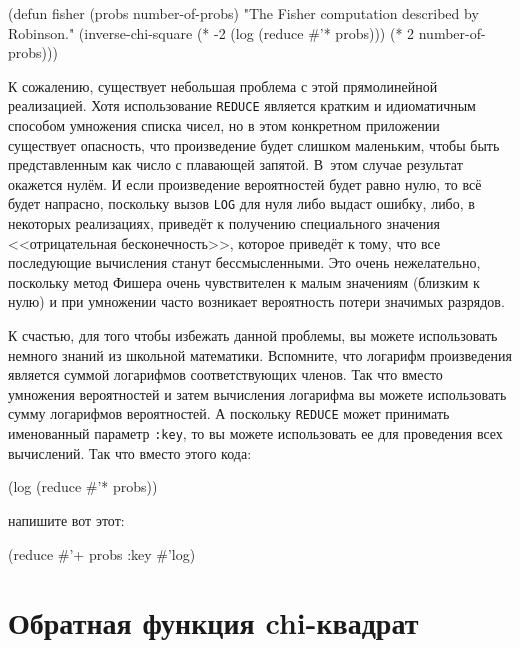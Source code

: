 \begin{myverb}
(defun fisher (probs number-of-probs)
  "The Fisher computation described by Robinson."
  (inverse-chi-square 
   (* -2 (log (reduce #'* probs)))
   (* 2 number-of-probs)))
\end{myverb}

К сожалению, существует небольшая проблема с этой прямолинейной реализацией.  Хотя
использование \lstinline{REDUCE} является кратким и идиоматичным способом умножения списка
чисел, но в этом конкретном приложении существует опасность, что произведение будет
слишком маленьким, чтобы быть представленным как число с плавающей запятой. В~этом случае
результат окажется нулём.  И если произведение
вероятностей будет равно нулю, то всё будет напрасно, поскольку вызов \lstinline{LOG} для нуля
либо выдаст ошибку, либо, в некоторых реализациях, приведёт к получению специального
значения <<отрицательная бесконечность>>, которое приведёт к тому, что все последующие
вычисления станут бессмысленными.  Это очень нежелательно, поскольку метод Фишера очень
чувствителен к малым значениям (близким к нулю) и при умножении часто возникает
вероятность потери значимых разрядов.

К счастью, для того чтобы избежать данной проблемы, вы можете использовать немного знаний
из школьной математики.  Вспомните, что логарифм произведения является суммой логарифмов
соответствующих членов.  Так что вместо умножения вероятностей и затем вычисления
логарифма вы можете использовать сумму логарифмов вероятностей.  А поскольку
\lstinline{REDUCE} может принимать именованный параметр \lstinline{:key}, то вы можете использовать
ее для проведения всех вычислений.  Так что вместо этого кода:

\begin{myverb}
(log (reduce #'* probs))
\end{myverb}

\noindent{}напишите вот этот:

\begin{myverb}
(reduce #'+ probs :key #'log)
\end{myverb}

\section{Обратная функция chi-квадрат}

